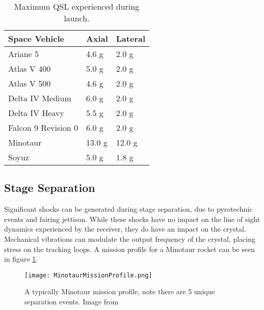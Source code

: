 \begin{table}[!htb]
\centering
\begin{tabular}{|l|l|l|}
\hline
\rowcolor[HTML]{C0C0C0} 
Space Vehicle       & Axial                   & Lateral                \\ \hline
Ariane 5            & 4.6 g \cite{Ariane}     & 2.0 g \cite{Ariane}    \\ \hline
\rowcolor[HTML]{EFEFEF} 
Atlas V 400         & 5.0 g \cite{AtlasV}     & 2.0 g \cite{AtlasV}    \\ \hline
Atlas V 500         & 4.6 g \cite{AtlasV}     & 2.0 g \cite{AtlasV}    \\ \hline
\rowcolor[HTML]{EFEFEF} 
Delta IV Medium     & 6.0 g \cite{DeltaIV}    & 2.0 g \cite{DeltaIV}   \\ \hline
Delta IV Heavy      & 5.5 g \cite{DeltaIV}    & 2.0 g \cite{DeltaIV}   \\ \hline
\rowcolor[HTML]{EFEFEF} 
Falcon 9 Revision 0 & 6.0 g \cite{Falcon9}    & 2.0 g \cite{Falcon9}   \\ \hline
Minotaur            & 13.0 g  \cite{Minotaur} & 12.0 g \cite{Minotaur} \\ \hline
\rowcolor[HTML]{EFEFEF} 
Soyuz               & 5.0 g \cite{Soyuz}      & 1.8 g \cite{Soyuz}     \\ \hline
\end{tabular}
\caption{Maximum \ac{QSL} experienced during launch.}
\label{QSLTable}
\end{table}



\subsection{Stage Separation}

Significant shocks can be generated during stage separation, due to pyrotechnic events and fairing jettison\cite{AtlasV,Ariane,DeltaIV}. While these shocks have no impact on the line of sight dynamics experienced by the receiver, they do have an impact on the crystal. Mechanical vibrations can modulate the output frequency of the crystal, placing stress on the tracking loops. A mission profile for a Minotaur rocket can be seen in figure \ref{fig:MinotaurMissionProfile}.


\begin{figure}[!htb] 
    \centering
    \texttt{[image: MinotaurMissionProfile.png]} 
    \caption{A typically Minotaur mission profile, note there are 5 unique separation events. Image from \cite{Minotaur}}
    \label{fig:MinotaurMissionProfile}
\end{figure}

